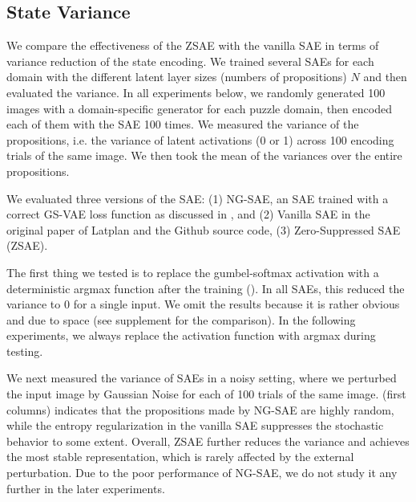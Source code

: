 \subsection{State Variance}

We compare the effectiveness of the ZSAE with the vanilla SAE in terms of variance reduction of the state encoding.
We trained several SAEs for each domain with the different latent layer sizes (numbers of propositions) $N$
and then evaluated the variance.
In all experiments below,
we randomly generated 100 images with a domain-specific generator for each puzzle domain,
then encoded each of them with the SAE 100 times.
We measured the variance of the propositions, i.e. the variance of latent activations (0 or 1)
across 100 encoding trials of the same image.
We then took the mean of the variances over the entire propositions.

We evaluated three versions of the SAE:
(1) NG-SAE, an SAE trained with a correct GS-VAE loss function as discussed in , and
(2) Vanilla SAE in the original paper of Latplan \cite{Asai2018} and the Github source code,
(3) Zero-Suppressed SAE (ZSAE).

The first thing we tested is to replace the gumbel-softmax activation with a deterministic argmax function
after the training ().
In all SAEs, this reduced the variance to 0 for a single input.
We omit the results because it is rather obvious and due to space
(see supplement  for the comparison).
In the following experiments, we always replace the activation function with argmax during testing.

We next measured the variance of SAEs in a noisy setting, where
we perturbed the input image by Gaussian Noise for each of 100 trials of the same image.
 (first columns) indicates that
the propositions made by NG-SAE are highly random,
while the entropy regularization in the vanilla SAE suppresses the stochastic behavior to some extent.
Overall, ZSAE further reduces the variance and achieves the most stable representation,
which is rarely affected by the external perturbation.
% 
Due to the poor performance of NG-SAE, we do not study it any further in the later experiments.

